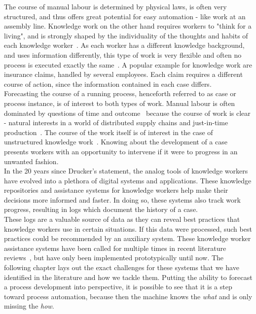 The course of manual labour is determined by physical laws, is often very structured, and thus offers great potential for easy automation - like work at an assembly line. Knowledge work on the other hand requires workers to "think for a living", and is strongly shaped by the individuality of the thoughts and habits of each knowledge worker~\cite{drucker1999}. As each worker has a different knowledge background, and uses information differently, this type of work is very flexible and often no process is executed exactly the same~\cite{hewelt2016}. A popular example for knowledge work are insurance claims, handled by several employees. Each claim requires a different course of action, since the information contained in each case differs.\\

Forecasting the course of a running process, henceforth referred to as case or process instance, is of interest to both types of work. Manual labour is often dominated by questions of time and outcome~\cite{rogge2013} because the course of work is clear - natural interests in a world of distributed supply chains and just-in-time production~\cite{web:economist:jit}. The course of the work itself is of interest in the case of unstructured knowledge work~\cite{francescomarino2015}. Knowing about the development of a case presents workers with an opportunity to intervene if it were to progress in an unwanted fashion.\\

In the 20 years since Drucker's statement, the analog tools of knowledge workers have evolved into a plethora of digital systems and applications. These knowledge repositories and assistance systems for knowledge workers help make their decisions more informed and faster. In doing so, these systems also track work progress, resulting in logs which document the history of a case.\\

These logs are a valuable source of data as they can reveal best practices that knowledge workers use in certain situations. If this data were processed, such best practices could be recommended by an auxiliary system. These knowledge worker assistance systems have been called for multiple times in recent literature reviews~\cite{hauder2014, francescomarino2018}, but have only been implemented prototypically until now. The following chapter lays out the exact challenges for these systems that we have identified in the literature and how we tackle them. Putting the ability to forecast a process development into perspective, it is possible to see that it is a step toward process automation, because then the machine knows the \textit{what} and is only missing the \textit{how}.

